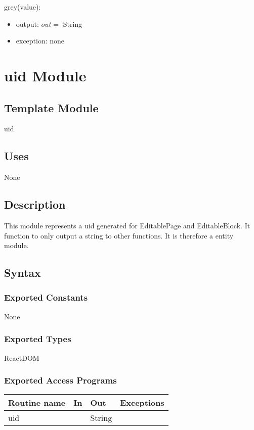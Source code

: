 \documentclass[12pt, titlepage]{article}
\begin{document}
\noindent grey(value):
\begin{itemize}
\item output: $out =$ String
\item exception: none
\end{itemize}

\newpage

\section{uid Module}

\subsection{Template Module}

uid

\subsection{Uses}

None

\subsection{Description}
This module represents a uid generated for EditablePage and EditableBlock. It function to only output a string to other functions. It is therefore a entity module.

\subsection{Syntax}

\subsubsection{Exported Constants}

None

\subsubsection{Exported Types}

ReactDOM

\subsubsection{Exported Access Programs}

\begin{tabular}{| l | l | l | l |}
  \hline
  \textbf{Routine name} & \textbf{In} & \textbf{Out} & \textbf{Exceptions}\\
  \hline
  uid & ~ & String & ~\\
  \hline
\end{tabular}
\end{document}
